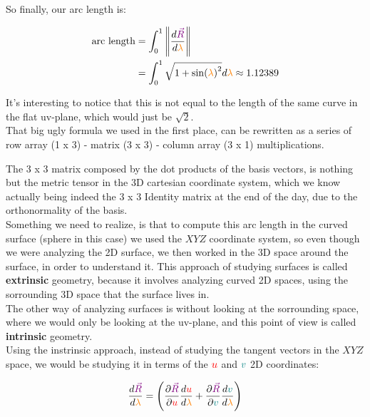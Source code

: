 So finally, our arc length is:

\begin{align*}
    \text{arc length} &= \int_{0}^{1} \norm{\frac{d\begingroup\color{violet}\vec{R}\endgroup}{d\begingroup\color{orange}\lambda\endgroup}}\\
    &= \int_{0}^{1} \sqrt{1 + \sin(\begingroup\color{orange}\lambda\endgroup)^2} d\begingroup\color{orange}\lambda\endgroup \approx 1.12389
\end{align*}

It's interesting to notice that this is not equal to the length of the same curve in the flat uv-plane, which would just be $\sqrt{2}$.\\
That big ugly formula we used in the first place, can be rewritten as a series of row array (1 x 3) - matrix (3 x 3) - column array (3 x 1) multiplications.

The 3 x 3 matrix composed by the dot products of the basis vectors, is nothing but the metric tensor in the 3D cartesian coordinate system, which we know 
actually being indeed the 3 x 3 Identity matrix at the end of the day, due to the orthonormality of the basis.\\

Something we need to realize, is that to compute this arc length in the curved surface (sphere in this case) we used the $XYZ$ coordinate system, so even though
we were analyzing the 2D surface, we then worked in the 3D space around the surface, in order to understand it.
This approach of studying surfaces is called \textbf{extrinsic} geometry, because it involves analyzing curved 2D spaces, using the sorrounding
3D space that the surface lives in.\\
The other way of analyzing surfaces is without looking at the sorrounding space, where we would only be looking at the uv-plane, and this point of view is called
\textbf{intrinsic} geometry.\\

Using the instrinsic approach, instead of studying the tangent vectors in the $XYZ$ space, we would be studying it in terms of the 
$\color{red}u$ and $\color{teal}v$ 2D coordinates:

\begin{equation} \label{eq:velocity-vector}
    \frac{d\begingroup\color{violet}\vec{R}\endgroup}{d\begingroup\color{orange}\lambda\endgroup} 
    = \left(\frac{\partial \begingroup\color{violet}\vec{R}\endgroup}{\partial \begingroup\color{red}u\endgroup} \frac{d\begingroup\color{red}u\endgroup}{d\begingroup\color{orange}\lambda\endgroup}
    + \frac{\partial \begingroup\color{violet}\vec{R}\endgroup}{\partial \begingroup\color{teal}v\endgroup} \frac{d\begingroup\color{teal}v\endgroup}{d\begingroup\color{orange}\lambda\endgroup}\right)
\end{equation}

